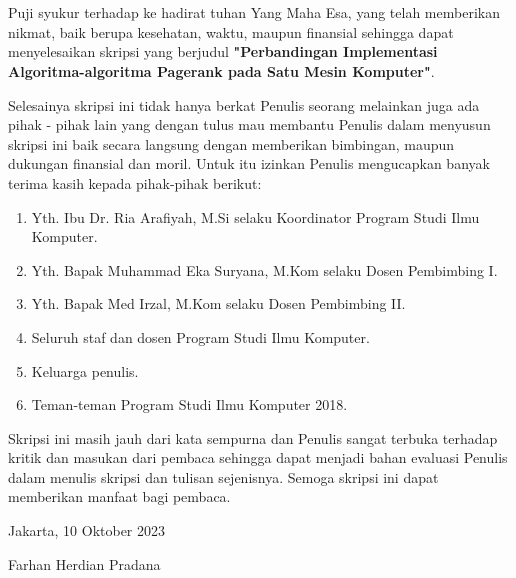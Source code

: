 \chapter*{}

Puji syukur terhadap ke hadirat tuhan Yang Maha Esa, yang telah memberikan nikmat, baik berupa kesehatan, waktu, maupun finansial sehingga dapat menyelesaikan skripsi yang berjudul \textbf{"Perbandingan Implementasi Algoritma-algoritma Pagerank pada Satu Mesin Komputer"}.

Selesainya skripsi ini tidak hanya berkat Penulis seorang melainkan juga ada pihak - pihak lain yang dengan tulus mau membantu Penulis dalam menyusun skripsi ini baik secara langsung dengan memberikan bimbingan, maupun dukungan finansial dan moril. Untuk itu izinkan Penulis mengucapkan banyak terima kasih kepada pihak-pihak berikut:

\begin{enumerate}[topsep=0pt, itemsep=-1ex]

	\item{Yth. Ibu Dr. Ria Arafiyah, M.Si selaku Koordinator Program Studi Ilmu Komputer.}
	\item{Yth. Bapak Muhammad Eka Suryana, M.Kom selaku Dosen Pembimbing I.}
	\item{Yth. Bapak Med Irzal, M.Kom selaku Dosen Pembimbing II.}
	\item{Seluruh staf dan dosen Program Studi Ilmu Komputer.}
	\item{Keluarga penulis.}
	\item{Teman-teman Program Studi Ilmu Komputer 2018.}
	
\end{enumerate}

Skripsi ini masih jauh dari kata sempurna dan Penulis sangat terbuka terhadap kritik dan masukan dari pembaca sehingga dapat menjadi bahan evaluasi Penulis dalam menulis skripsi dan tulisan sejenisnya. Semoga skripsi ini dapat memberikan manfaat bagi pembaca. 

\begin{flushright}
Jakarta, 10 Oktober 2023

\vspace{2cm}

Farhan Herdian Pradana
\end{flushright}